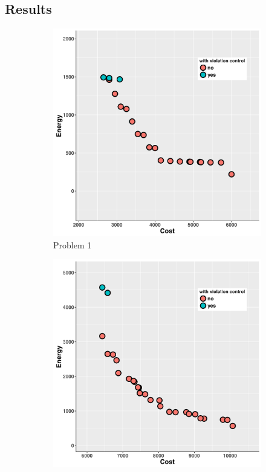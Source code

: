 \subsection{Results}
\begin{figure}
   \centering
   \begin{subfigure}[b]{0.45\textwidth}\includegraphics[width=\textwidth]{pics/preliminary/1/evolve.png}
   \caption{Problem 1}
   \label{fig:a}
   \end{subfigure}
   \begin{subfigure}[b]{0.45\textwidth}\includegraphics[width=\textwidth]{pics/preliminary/2/evolve.png}

\end{subfigure}
\end{figure}
